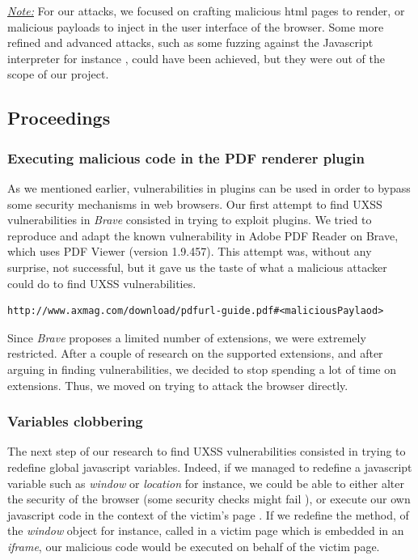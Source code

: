 \documentclass[journal]{IEEEtran}
\begin{document}
\medskip

\underline{\emph{Note:}} For our attacks, we focused on crafting malicious html pages to render, or malicious payloads to inject in the user interface of the browser. Some more refined and advanced attacks, such as some fuzzing  against the Javascript interpreter for instance \cite{microsoftFuzzingOnv8}, could have been achieved, but they were out of the scope of our project.

\subsection{Proceedings}

\subsubsection*{Executing malicious code in the PDF renderer plugin}

As we mentioned earlier, vulnerabilities in plugins can be used in order to bypass some security mechanisms in web browsers. Our first attempt to find UXSS vulnerabilities in \emph{Brave} consisted in trying to exploit plugins. We tried to reproduce and adapt the known vulnerability in Adobe PDF Reader \cite{uxssPDF} on Brave, which uses PDF Viewer (version 1.9.457). This attempt was, without any surprise, not successful, but it gave us the taste of what a malicious attacker could do to find UXSS vulnerabilities.

\begin{lstlisting}[caption=The attack vector we tried to use to execute malicious javascript using the PDF viewer]
http://www.axmag.com/download/pdfurl-guide.pdf#<maliciousPaylaod>
\end{lstlisting}

\medskip

Since \emph{Brave} proposes a limited number of extensions, we were extremely restricted. After a couple of research on the supported extensions, and after arguing in finding vulnerabilities, we decided to stop spending a lot of time on extensions. Thus, we moved on trying to attack the browser directly.

\subsubsection*{Variables clobbering}

The next step of our research to find UXSS vulnerabilities consisted in trying to redefine global javascript variables. Indeed, if we managed to redefine a javascript variable such as \emph{window} or \emph{location} for instance, we could be able to either alter the security of the browser (some security checks might fail \cite{frameBustingLocationClubbered}), or execute our own javascript code in the context of the victim's page \cite{uxssJSLeaks}. If we redefine the method, of the \emph{window} object for instance, called in a victim page which is embedded in an \emph{iframe}, our malicious code would be executed on behalf of the victim page.
\end{document}
